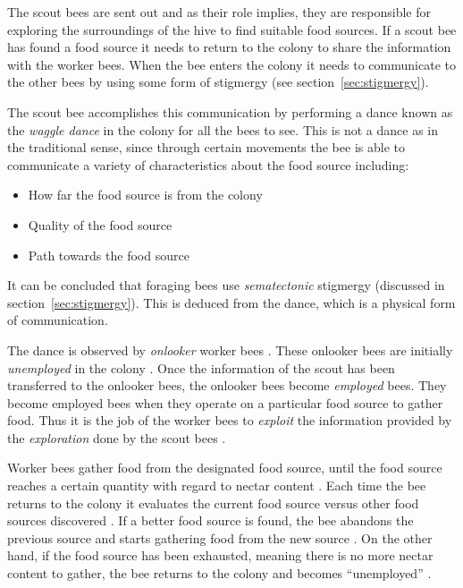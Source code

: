 The scout bees are sent out and as their role implies, they are responsible for exploring the surroundings of the hive to find suitable food sources\cite{ABCCompareStudy}. If a scout bee has found a food source it needs to return to the colony to share the information with the worker bees\cite{ABCCompareStudy}. When the bee enters the colony it needs to communicate to the other bees by using some form of stigmergy (see section~\ref{sec:stigmergy})\cite{ABCCompareStudy}.

The scout bee accomplishes this communication by performing a dance known as the \emph{waggle dance} in the colony for all the bees to see\cite{ABCCompareStudy}. This is not a dance as in the traditional sense, since through certain movements the bee is able to communicate a variety of characteristics about the food source including\cite{ABCCompareStudy}:
\begin{itemize}
\item How far the food source is from the colony
\item Quality of the food source
\item Path towards the food source
\end{itemize}

It can be concluded that foraging bees use \emph{sematectonic} stigmergy (discussed in section~\ref{sec:stigmergy}). This is deduced from the dance, which is a physical form of communication.

The dance is observed by \emph{onlooker} worker bees \cite{ABCCompareStudy,ABCImageEnhancement}. These onlooker bees are initially \emph{unemployed} in the colony \cite{ABCCompareStudy,ABCImageEnhancement}. Once the information of the scout has been transferred to the onlooker bees, the onlooker bees become \emph{employed} bees\cite{ABCCompareStudy,ABCImageEnhancement}. They become employed bees when they operate on a particular food source to gather food\cite{ABCCompareStudy,ABCImageEnhancement}. Thus it is the job of the worker bees to \emph{exploit} the information provided by the \emph{exploration} done by the scout bees \cite{ABCCompareStudy,ABCNumericalOptimization}. 

Worker bees gather food from the designated food source, until the food source reaches a certain quantity with regard to nectar content \cite{ABCCompareStudy,ABCNumericalOptimization}. Each time the bee returns to the colony it evaluates the current food source versus other food sources discovered \cite{ABCCompareStudy,ABCNumericalOptimization}. If a better food source is found, the bee abandons the previous source and starts gathering food from the new source \cite{ABCCompareStudy,ABCNumericalOptimization}. On the other hand, if the food source has been exhausted, meaning there is no more nectar content to gather, the bee returns to the colony and becomes ``unemployed'' \cite{ABCCompareStudy,ABCNumericalOptimization}.

